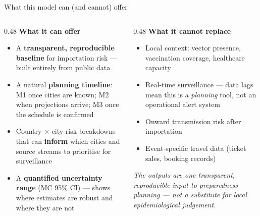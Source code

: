 \documentclass[aspectratio=169, 11pt]{beamer}
\begin{document}
\begin{frame}{What this model can (and cannot) offer}
  \begin{columns}[T]
    \begin{column}{0.48\textwidth}
      \textbf{What it can offer}
      \begin{itemize}
        \item A \textbf{transparent, reproducible baseline}
              for importation risk — built entirely from
              public data
        \item A natural \textbf{planning timeline}: M1
              once cities are known; M2 when projections
              arrive; M3 once the schedule is confirmed
        \item Country $\times$ city risk breakdowns that
              can \textbf{inform} which cities and source
              streams to prioritise for surveillance
        \item A \textbf{quantified uncertainty range}
              (MC 95\% CI) — shows where estimates are
              robust and where they are not
      \end{itemize}
    \end{column}
    \begin{column}{0.48\textwidth}
      \textbf{What it cannot replace}
      \begin{itemize}
        \item Local context: vector presence, vaccination
              coverage, healthcare capacity
        \item Real-time surveillance — data lags mean
              this is a \textit{planning} tool, not an
              operational alert system
        \item Onward transmission risk after importation
        \item Event-specific travel data (ticket sales,
              booking records)
      \end{itemize}
      \vspace{4pt}
      {\small\textit{The outputs are one transparent,
      reproducible input to preparedness planning —
      not a substitute for local epidemiological
      judgement.}}
    \end{column}
  \end{columns}
\end{frame}
\end{document}
